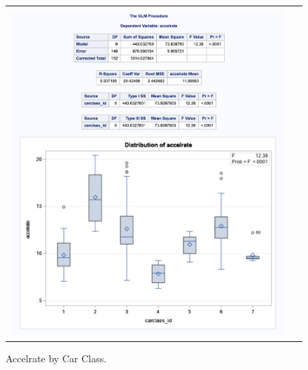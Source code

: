 \documentclass[acmsmall]{acmart}
\begin{document}
\begin{figure}[H] %
	\centering
	\begin{tabular}{| p{}|}
	\hline
	\\
	\includegraphics[width=0.95\textwidth]{../graphics/AccelrateByCarclass}\\
	\hline
	\end{tabular}	
	\caption{Accelrate by Car Class.} %
	\label{fig:ABCC}
\end{figure}
\end{document}
